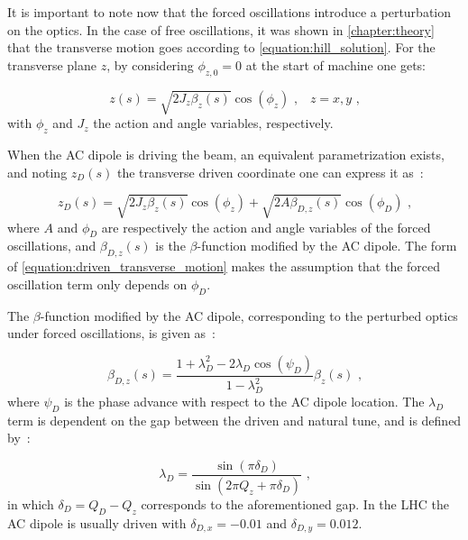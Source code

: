 It is important to note now that the forced oscillations introduce a perturbation on the optics.
In the case of free oscillations, it was shown in \cref{chapter:theory} that the transverse motion goes according to \cref{equation:hill_solution}.
For the transverse plane \(z\), by considering \(\phi_{z,0} = 0\) at the start of machine one gets:

\begin{equation}
  z(s) = \sqrt{2 J_z \beta_z(s)} \cos \left( \phi_z \right)  \text{ ,} \quad z = x, y \text{ ,}
  \label{equation:free_transverse_motion}
\end{equation}
with \(\phi_z\) and \(J_z\) the action and angle variables, respectively.

When the AC dipole is driving the beam, an equivalent parametrization exists, and noting \(z_D(s)\) the transverse driven coordinate one can express it as~\cite{PHD:Miyamoto,PRAB:Tomas:Normal_Form_Particle_Motion_AC_Dipole}:

\begin{equation}
  z_D(s)=\sqrt{2 J_z \beta_z(s)} \cos \left( \phi_z \right) + \sqrt{2 A \beta_{D,z}(s)} \cos \left( \phi_D \right) \text{ ,}
  \label{equation:driven_transverse_motion}
\end{equation}
where \(A\) and \(\phi_D\) are respectively the action and angle variables of the forced oscillations, and \(\beta_{D,z}(s)\) is the \(\beta\)-function modified by the AC dipole.
The form of \cref{equation:driven_transverse_motion} makes the assumption that the forced oscillation term only depends on \(\phi_D\).

The \(\beta\)-function modified by the AC dipole, corresponding to the perturbed optics under forced oscillations, is given as~\cite{PRAB:Miyamoto:Parametrization_Driven_Betatron_Oscillation}:

\begin{equation}
  \beta_{D,z}(s) = \frac{1 + \lambda_D^2 - 2 \lambda_D \cos \left(\psi_D\right)}{1 - \lambda_D^2} \beta_z(s) \text{ ,}
  \label{equation:driven_beta_function}
\end{equation}
where \(\psi_D\) is the phase advance with respect to the AC dipole location.%
The \(\lambda_D\) term is dependent on the gap between the driven and natural tune, and is defined by~\cite{PRAB:Miyamoto:Parametrization_Driven_Betatron_Oscillation}:

\begin{equation}
  \lambda_D = \frac{\sin \left(\pi \delta_D \right)}{\sin \left(2 \pi Q_z + \pi \delta_D \right)} \text{ ,}
  \label{equation:driven_oscillations_lambda_D}
\end{equation}
in which \(\delta_D = Q_D - Q_z\) corresponds to the aforementioned gap.
In the LHC the AC dipole is usually driven with \(\delta_{D,x} = -0.01\) and \(\delta_{D,y} = 0.012\).

